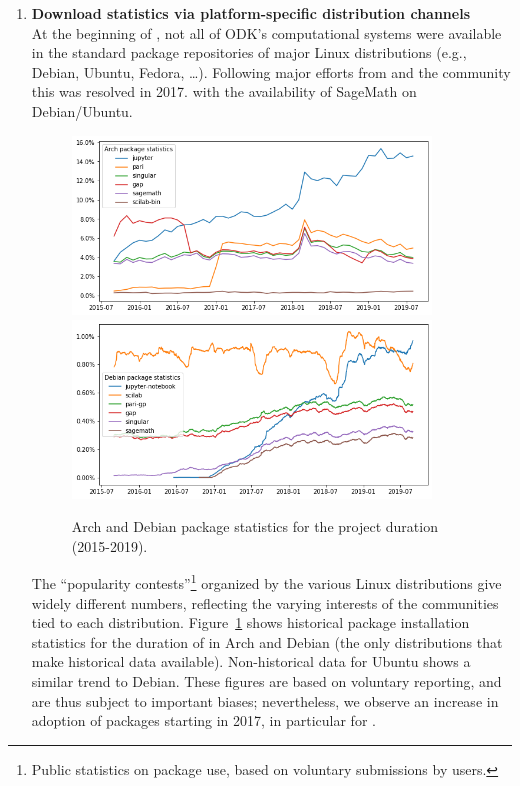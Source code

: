 \begin{enumerate}
\item \textbf{Download statistics via platform-specific distribution
    channels}\\
  At the beginning of \ODK, not all of ODK's computational systems
  were available in the standard package repositories of major Linux
  distributions (e.g., Debian, Ubuntu, Fedora, \dots). Following major
  efforts from \ODK and the community this was resolved in 2017. with
  the availability of SageMath on Debian/Ubuntu.
  
  \begin{figure}
    \centering
    \includegraphics[width=0.9\textwidth]{arch-pkgstats.png}
    \includegraphics[width=0.9\textwidth]{debian-pkgstats.png}
    \caption{Arch and Debian package statistics for the project
      duration (2015-2019).}
    \label{fig:pkgstats}
  \end{figure}

  The ``popularity contests''\footnote{Public statistics on package
    use, based on voluntary submissions by users.} organized by the
  various Linux distributions give widely different numbers,
  reflecting the varying interests of the communities tied to each
  distribution. Figure~\ref{fig:pkgstats} shows historical package
  installation statistics for the duration of \ODK in Arch and Debian
  (the only distributions that make historical data
  available). Non-historical data for Ubuntu shows a similar trend to
  Debian. These figures are based on voluntary reporting, and are thus
  subject to important biases; nevertheless, we observe an increase in
  adoption of \ODK packages starting in 2017, in particular for
  \Jupyter.
  

\end{enumerate}
